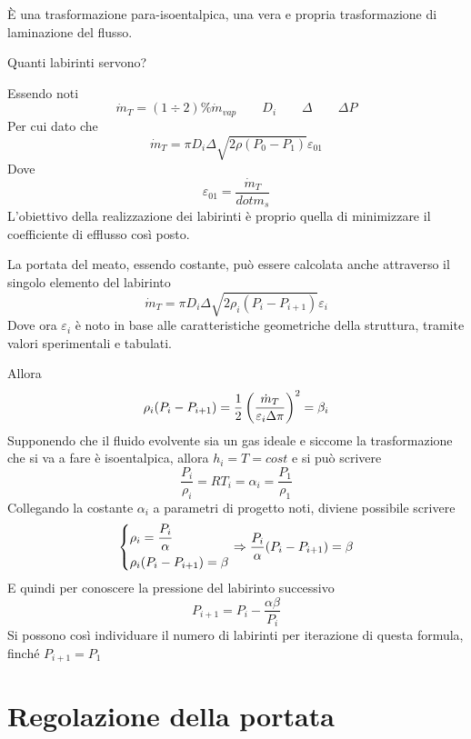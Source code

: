 \documentclass[a4paper, 15pt]{article}
\begin{document}
\begin{adjustwidth}{2in}{}
	È una trasformazione para-isoentalpica, una vera e propria trasformazione di laminazione del flusso. 
	
	Quanti labirinti servono?
	
	Essendo noti
	\[\dot{m}_T=(1\div2)\%\dot{m}_{vap} \qquad D_i \qquad \Delta \qquad \Delta P \]
	Per cui dato che 
	\[\dot{m}_T = \pi D_i\Delta\sqrt{2\rho(P_0-P_1)}\varepsilon_{01} \]
	Dove 
	\[\varepsilon_{01} = \dfrac{\dot{m}_T}{dot{m}_s}\]
	L'obiettivo della realizzazione dei labirinti è proprio quella di minimizzare il coefficiente di efflusso così posto. 
	
	La portata del meato, essendo costante, può essere calcolata anche attraverso il singolo elemento del labirinto
	\[\dot{m}_T = \pi D_i\Delta\sqrt{2\rho_i(P_i-P_{i+1})}\varepsilon_i \] 
	Dove ora $\varepsilon_i$ è noto in base alle caratteristiche geometriche della struttura, tramite valori sperimentali e tabulati. 
	
	Allora 
	\[\rho_i(P_i-P_{i+1}) ={1\over2}\left(\dfrac{\dot{m}_T}{\varepsilon_i\Delta\pi}\right)^2 = \beta_i\]
	Supponendo che il fluido evolvente sia un gas ideale e siccome la trasformazione che si va a fare è isoentalpica, allora $h_i=T=cost$ e si può scrivere 
	\[\dfrac{P_i}{\rho_i}=RT_i=\alpha_i = \dfrac{P_1}{\rho_1}\] 
	Collegando la costante $\alpha_i$ a parametri di progetto noti, diviene possibile scrivere
	\[\begin{dcases}
		\rho_i = \dfrac{P_i}{\alpha} \\
		\rho_i(P_i-P_{i+1}) = \beta
	\end{dcases} \Rightarrow \dfrac{P_i}{\alpha}(P_i-P_{i+1}) = \beta\]
	E quindi per conoscere la pressione del labirinto successivo
	\[P_{i+1} = P_i-\dfrac{\alpha\beta}{P_i}\]
	Si possono così individuare il numero di labirinti per iterazione di questa formula, finché $P_{i+1} = P_1$	
\end{adjustwidth}




\section{Regolazione della portata}
\end{document}
